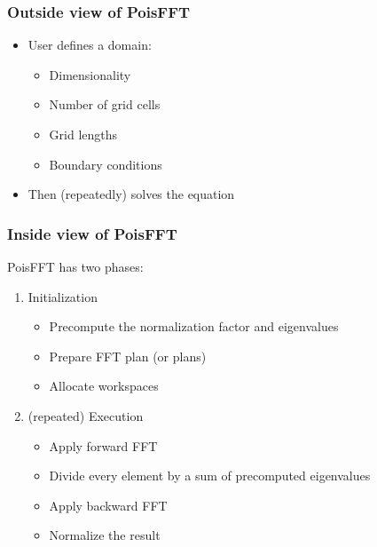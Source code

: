 \documentclass{beamer}
\begin{document}
\begin{frame}
    \frametitle{Outside view of PoisFFT}
    \begin{itemize}
        \item User defines a domain:\pause
            \begin{itemize}
                \item Dimensionality
                \item Number of grid cells
                \item Grid lengths
                \item Boundary conditions\pause
            \end{itemize}
        \item Then (repeatedly) solves the equation
    \end{itemize}
\end{frame}

\begin{frame}
    \frametitle{Inside view of PoisFFT}
    PoisFFT has two phases:\pause
    \begin{enumerate}
        \item \alert{Initialization}\pause
            \begin{itemize}
                \item Precompute the normalization factor and eigenvalues
                \item Prepare FFT plan (or plans)
                \item Allocate workspaces\pause
            \end{itemize}
        \item (repeated) \alert{Execution}\pause
            \begin{itemize}
                \item Apply forward FFT
                \item Divide every element by a sum of precomputed eigenvalues
                \item Apply backward FFT
                \item Normalize the result
            \end{itemize}
    \end{enumerate}
\end{frame}
\end{document}
